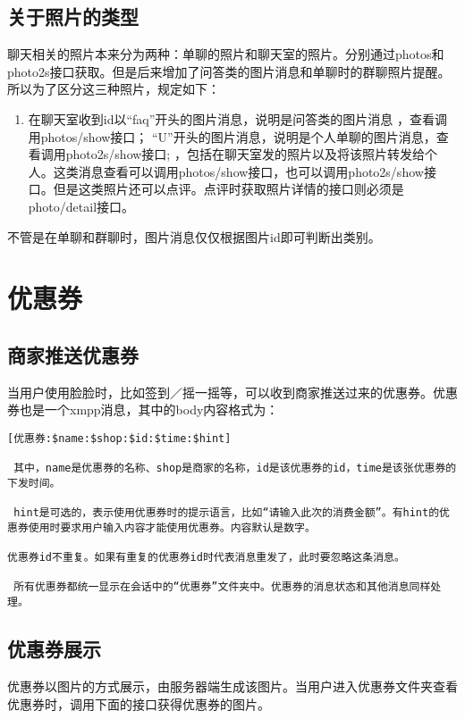 \subsection{关于照片的类型}
聊天相关的照片本来分为两种：单聊的照片和聊天室的照片。分别通过photos和photo2s接口获取。但是后来增加了问答类的图片消息和单聊时的群聊照片提醒。所以为了区分这三种照片，规定如下：
\begin{enumerate}
\item 在聊天室收到id以“faq”开头的图片消息，说明是问答类的图片消息 ，查看调用photos/show接口；
“U”开头的图片消息，说明是个人单聊的图片消息，查看调用photo2s/show接口;
，包括在聊天室发的照片以及将该照片转发给个人。这类消息查看可以调用photos/show接口，也可以调用photo2s/show接口。但是这类照片还可以点评。点评时获取照片详情的接口则必须是photo/detail接口。
\end{enumerate}

不管是在单聊和群聊时，图片消息仅仅根据图片id即可判断出类别。





\section{优惠券}

\subsection{商家推送优惠券}
当用户使用脸脸时，比如签到／摇一摇等，可以收到商家推送过来的优惠券。优惠券也是一个xmpp消息，其中的body内容格式为：

\begin{verbatim}
[优惠券:$name:$shop:$id:$time:$hint]

 其中，name是优惠券的名称、shop是商家的名称，id是该优惠券的id，time是该张优惠券的下发时间。
 
 hint是可选的，表示使用优惠券时的提示语言，比如“请输入此次的消费金额”。有hint的优惠券使用时要求用户输入内容才能使用优惠券。内容默认是数字。
 
优惠券id不重复。如果有重复的优惠券id时代表消息重发了，此时要忽略这条消息。
 
 所有优惠券都统一显示在会话中的“优惠券”文件夹中。优惠券的消息状态和其他消息同样处理。
\end{verbatim}

\subsection{优惠券展示}
优惠券以图片的方式展示，由服务器端生成该图片。当用户进入优惠券文件夹查看优惠券时，调用下面的接口获得优惠券的图片。


